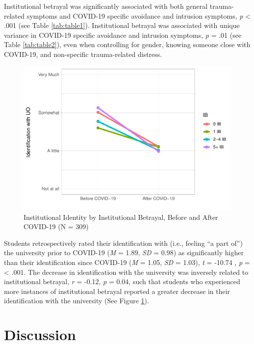 \documentclass[
  english,
  man, noextraspace]{apa6}
\begin{document}
Institutional betrayal was significantly associated with both general trauma-related symptoms and COVID-19 specific avoidance and intrusion symptoms, \emph{p} \textless{} .001 (see Table \ref{tab:table1}). Institutional betrayal was associated with unique variance in COVID-19 specific avoidance and intrusion symptoms, \emph{p} = .01 (see Table \ref{tab:table2}), even when controlling for gender, knowing someone close with COVID-19, and non-specific trauma-related distress.

\begin{figure}[H]

{\centering \includegraphics[width=\textwidth]{papaja_doc_files/figure-latex/figure3-1} 

}

\caption{Institutional Identity by Institutional Betrayal, Before and After COVID-19 (N = 309) 
}\label{fig:figure3}
\end{figure}

Students retrospectively rated their identification with (i.e., feeling \enquote{a part of}) the university prior to COVID-19 (\emph{M} = 1.89, \emph{SD} = 0.98) as significantly higher than their identification since COVID-19 (\emph{M} = 1.05, \emph{SD} = 1.03), \emph{t} = -10.74 , \emph{p} = \textless{} .001. The decrease in identification with the university was inversely related to institutional betrayal, \emph{r} = -0.12, \emph{p} = 0.04, such that students who experienced more instances of institutional betrayal reported a greater decrease in their identification with the university (See Figure \ref{fig:figure3}).

\hypertarget{discussion}{%
\section{Discussion}\label{discussion}}
\end{document}
